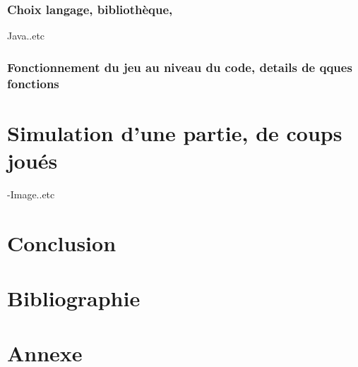\documentclass[a4]{article}
\begin{document}
										
					\subsubsection{Choix langage, bibliothèque,}	
					   Java..etc
					\subsubsection{Fonctionnement du jeu au niveau du code, details de qques fonctions}

	\section{Simulation d'une partie, de coups joués}
	-Image..etc
	
	\section{Conclusion}
	
	\section{Bibliographie}
		

	\section{Annexe}

	
\end{document}
